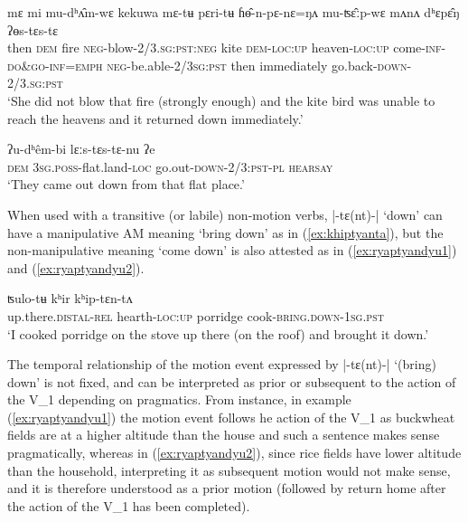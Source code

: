 \documentclass[oneside,a4paper,11pt]{article}
\newcommand{\ipa}[1]{{\phon#1}}
\newcommand{\dhatu}[2]{|\ipa{#1}| `#2'}
\begin{document}
\begin{exe}
\ex \label{ex:yostyastya}
 \gll \ipa{mʌnʌ}	\ipa{mɛ}	\ipa{mi}	\ipa{mu-dʰʌ̂m-wɛ}	\ipa{kekuwa}	\ipa{mɛ-tʉ}	\ipa{pɛri-tʉ}	\ipa{ɦɵ̂-n-pɛ-nɛ=ŋʌ}	\ipa{mu-ʦɛ̂ːp-wɛ}	\ipa{mʌnʌ}	\ipa{dʰɛpɛ̂ŋ}	\ipa{ʔɵs-tɛs-tɛ}	 \\
 then \textsc{dem} fire \textsc{neg}-blow-\textsc{2/3.sg:pst:neg} kite \textsc{dem}-\textsc{loc}:\textsc{up} heaven-\textsc{loc}:\textsc{up} come-\textsc{inf}-\textsc{do\&go}-\textsc{inf}=\textsc{emph} \textsc{neg}-be.able-\textsc{2/3sg:pst} then immediately go.back-\textsc{down}-2/3.\textsc{sg}:\textsc{pst} \\
   \glt `She did not blow that fire (strongly enough) and the kite bird was unable to reach the heavens and it returned down immediately.'
 \end{exe}
 
 \begin{exe}
\ex \label{ex:lyaastyastyanu}
 \gll  \ipa{mɛ}	\ipa{ʔu-dʰêm-bi}	\ipa{lɛːs-tɛs-tɛ-nu}	\ipa{ʔe}  \\
 \textsc{dem} \textsc{3sg.poss}-flat.land-\textsc{loc} go.out-\textsc{down}-2/3:\textsc{pst}-\textsc{pl} \textsc{hearsay} \\
 \glt `They came out down from that flat place.'
  \end{exe}
  
When used with a transitive (or labile) non-motion verbs, \dhatu{-tɛ(nt)-}{down} can have  a manipulative AM meaning `bring down' as in (\ref{ex:khiptyanta}), but the non-manipulative meaning `come down' is also attested as in (\ref{ex:ryaptyandyu1}) and (\ref{ex:ryaptyandyu2}).
 
\begin{exe}
\ex \label{ex:khiptyanta}
 \gll \ipa{tukkâ-m}	\ipa{ʦulo-tʉ}	\ipa{kʰir}	\ipa{kʰip-tɛn-tʌ} \\
  up.there.\textsc{distal}-\textsc{rel} hearth-\textsc{loc}:\textsc{up} porridge cook-\textsc{bring.down}-\textsc{1sg}.\textsc{pst} \\
  \glt `I cooked porridge on the stove up there (on the roof) and brought it down.'
 \end{exe}
 
The temporal relationship of the motion event expressed by  \dhatu{-tɛ(nt)-}{(bring) down} is not fixed, and can be interpreted as prior or subsequent to the action of the V_1 depending on pragmatics. From instance, in example   (\ref{ex:ryaptyandyu1}) the motion event follows he action of the V_1 as buckwheat fields are at a higher altitude than the house and such a sentence makes sense pragmatically, whereas in   (\ref{ex:ryaptyandyu2}),  since rice fields have lower altitude than the household, interpreting it as subsequent motion would not make sense, and it is therefore understood as a prior motion (followed by return home after the action of the V_1 has been completed).
\end{document}
